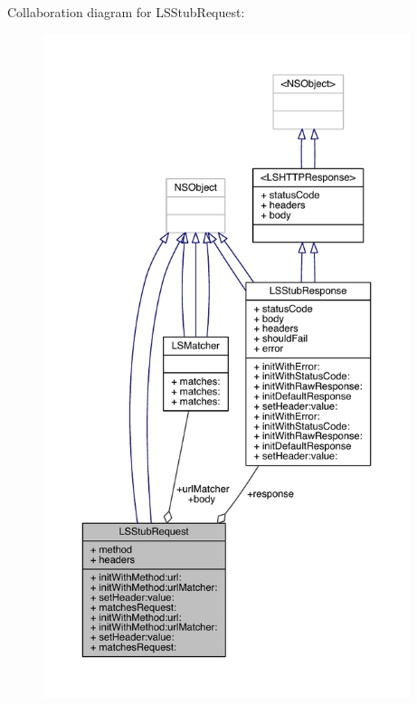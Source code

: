 Collaboration diagram for L\-S\-Stub\-Request\-:\nopagebreak
\begin{figure}[H]
\begin{center}
\leavevmode
\includegraphics[height=550pt]{interface_l_s_stub_request__coll__graph}
\end{center}
\end{figure}

